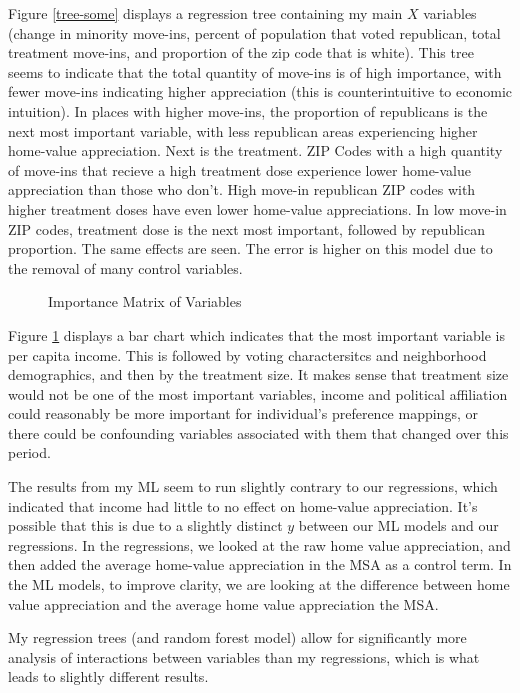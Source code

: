 \documentclass{article}
\begin{document}
    Figure \ref{tree-some} displays a regression tree containing my main \(X\) variables (change in minority
move-ins, percent of population that voted republican, total treatment
move-ins, and proportion of the zip code that is white). This tree seems
to indicate that the total quantity of move-ins is of high importance,
with fewer move-ins indicating higher appreciation (this is
counterintuitive to economic intuition). In places with higher move-ins,
the proportion of republicans is the next most important variable, with
less republican areas experiencing higher home-value appreciation. Next
is the treatment. ZIP Codes with a high quantity of move-ins that
recieve a high treatment dose experience lower home-value appreciation
than those who don't. High move-in republican ZIP codes with higher
treatment doses have even lower home-value appreciations. In low move-in
ZIP codes, treatment dose is the next most important, followed by
republican proportion. The same effects are seen. The error is higher on
this model due to the removal of many control variables.
\begin{figure}[htbp]
    \caption{Importance Matrix of Variables}
    \label{imp-mat}
\end{figure}
    
    Figure \ref{imp-mat} displays a bar chart which indicates that the most important variable is per
capita income. This is followed by voting charactersitcs and
neighborhood demographics, and then by the treatment size. It makes sense that treatment size would not be one of the most important variables, income and political affiliation could reasonably be more important for individual's preference mappings, or there could be confounding variables associated with them that changed over this period. 

The results from my ML seem to run slightly contrary to our regressions,
which indicated that income had little to no effect on home-value
appreciation. It's possible that this is due to a slightly distinct
\(y\) between our ML models and our regressions. In the regressions, we
looked at the raw home value appreciation, and then added the average
home-value appreciation in the MSA as a control term. In the ML models,
to improve clarity, we are looking at the difference between home value
appreciation and the average home value appreciation the MSA.

My regression trees (and random forest model) allow for significantly
more analysis of interactions between variables than my regressions, which is what leads to slightly different results.
\end{document}
